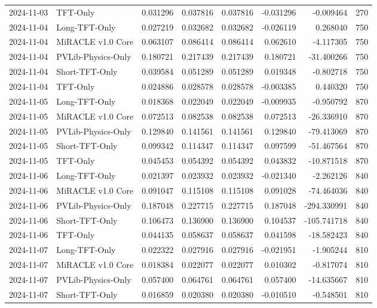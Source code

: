 \begin{tabular}{llrrrrrr}
2024-11-03 & TFT-Only & 0.031296 & 0.037816 & 0.037816 & -0.031296 & -0.009464 & 270 \\
2024-11-04 & Long-TFT-Only & 0.027219 & 0.032682 & 0.032682 & -0.026119 & 0.268040 & 750 \\
2024-11-04 & MiRACLE v1.0 Core & 0.063107 & 0.086414 & 0.086414 & 0.062610 & -4.117305 & 750 \\
2024-11-04 & PVLib-Physics-Only & 0.180721 & 0.217439 & 0.217439 & 0.180721 & -31.400266 & 750 \\
2024-11-04 & Short-TFT-Only & 0.039584 & 0.051289 & 0.051289 & 0.019348 & -0.802718 & 750 \\
2024-11-04 & TFT-Only & 0.024886 & 0.028578 & 0.028578 & -0.003385 & 0.440320 & 750 \\
2024-11-05 & Long-TFT-Only & 0.018368 & 0.022049 & 0.022049 & -0.009935 & -0.950792 & 870 \\
2024-11-05 & MiRACLE v1.0 Core & 0.072513 & 0.082538 & 0.082538 & 0.072513 & -26.336910 & 870 \\
2024-11-05 & PVLib-Physics-Only & 0.129840 & 0.141561 & 0.141561 & 0.129840 & -79.413069 & 870 \\
2024-11-05 & Short-TFT-Only & 0.099342 & 0.114347 & 0.114347 & 0.097599 & -51.467564 & 870 \\
2024-11-05 & TFT-Only & 0.045453 & 0.054392 & 0.054392 & 0.043832 & -10.871518 & 870 \\
2024-11-06 & Long-TFT-Only & 0.021397 & 0.023932 & 0.023932 & -0.021340 & -2.262126 & 840 \\
2024-11-06 & MiRACLE v1.0 Core & 0.091047 & 0.115108 & 0.115108 & 0.091028 & -74.464036 & 840 \\
2024-11-06 & PVLib-Physics-Only & 0.187048 & 0.227715 & 0.227715 & 0.187048 & -294.330991 & 840 \\
2024-11-06 & Short-TFT-Only & 0.106473 & 0.136900 & 0.136900 & 0.104537 & -105.741718 & 840 \\
2024-11-06 & TFT-Only & 0.044135 & 0.058637 & 0.058637 & 0.041598 & -18.582423 & 840 \\
2024-11-07 & Long-TFT-Only & 0.022322 & 0.027916 & 0.027916 & -0.021951 & -1.905244 & 810 \\
2024-11-07 & MiRACLE v1.0 Core & 0.018384 & 0.022077 & 0.022077 & 0.010302 & -0.817074 & 810 \\
2024-11-07 & PVLib-Physics-Only & 0.057400 & 0.064761 & 0.064761 & 0.057400 & -14.635667 & 810 \\
2024-11-07 & Short-TFT-Only & 0.016859 & 0.020380 & 0.020380 & -0.010510 & -0.548501 & 810 \\

\end{tabular}
